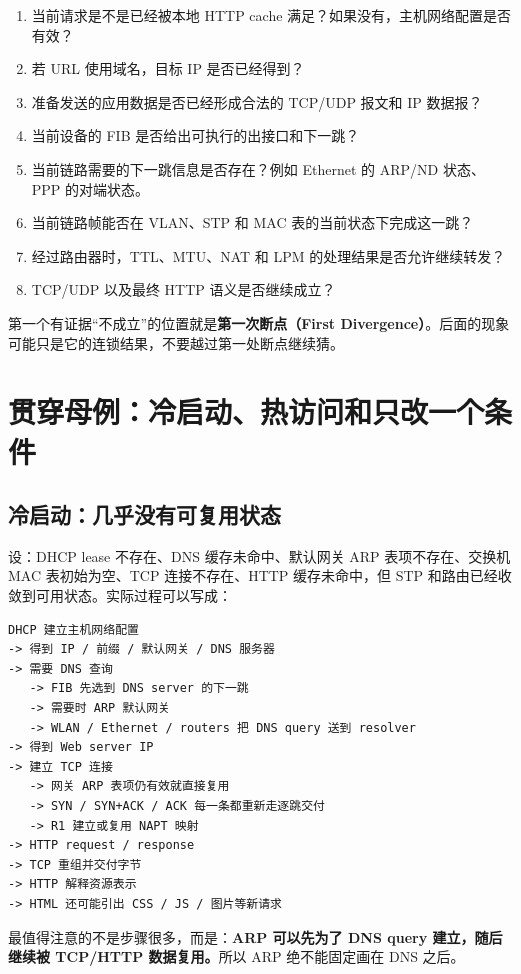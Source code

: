 \documentclass[UTF8,fontset=none,11pt,a4paper]{ctexart}
\begin{document}
\begin{enumerate}
  \item 当前请求是不是已经被本地 HTTP cache 满足？如果没有，主机网络配置是否有效？
  \item 若 URL 使用域名，目标 IP 是否已经得到？
  \item 准备发送的应用数据是否已经形成合法的 TCP/UDP 报文和 IP 数据报？
  \item 当前设备的 FIB 是否给出可执行的出接口和下一跳？
  \item 当前链路需要的下一跳信息是否存在？例如 Ethernet 的 ARP/ND 状态、PPP 的对端状态。
  \item 当前链路帧能否在 VLAN、STP 和 MAC 表的当前状态下完成这一跳？
  \item 经过路由器时，TTL、MTU、NAT 和 LPM 的处理结果是否允许继续转发？
  \item TCP/UDP 以及最终 HTTP 语义是否继续成立？
\end{enumerate}

第一个有证据“不成立”的位置就是\textbf{第一次断点（First Divergence）}。后面的现象可能只是它的连锁结果，不要越过第一处断点继续猜。

\section{贯穿母例：冷启动、热访问和只改一个条件}

\subsection{冷启动：几乎没有可复用状态}

设：DHCP lease 不存在、DNS 缓存未命中、默认网关 ARP 表项不存在、交换机 MAC 表初始为空、TCP 连接不存在、HTTP 缓存未命中，但 STP 和路由已经收敛到可用状态。实际过程可以写成：

\begin{verbatim}
DHCP 建立主机网络配置
-> 得到 IP / 前缀 / 默认网关 / DNS 服务器
-> 需要 DNS 查询
   -> FIB 先选到 DNS server 的下一跳
   -> 需要时 ARP 默认网关
   -> WLAN / Ethernet / routers 把 DNS query 送到 resolver
-> 得到 Web server IP
-> 建立 TCP 连接
   -> 网关 ARP 表项仍有效就直接复用
   -> SYN / SYN+ACK / ACK 每一条都重新走逐跳交付
   -> R1 建立或复用 NAPT 映射
-> HTTP request / response
-> TCP 重组并交付字节
-> HTTP 解释资源表示
-> HTML 还可能引出 CSS / JS / 图片等新请求
\end{verbatim}

最值得注意的不是步骤很多，而是：\textbf{ARP 可以先为了 DNS query 建立，随后继续被 TCP/HTTP 数据复用。}所以 ARP 绝不能固定画在 DNS 之后。
\end{document}
